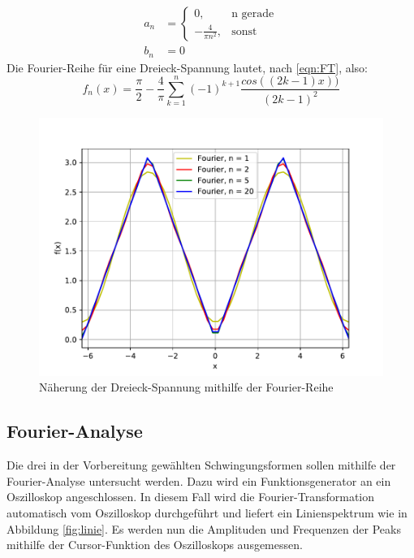 \begin{align}
  a_n &= \begin{cases}
    0 , & \text{n gerade} \\
     -\frac{4}{\pi n^2}, & \text{sonst}
\end{cases}\\
  b_n &= 0
\end{align}
Die Fourier-Reihe für eine Dreieck-Spannung lautet, nach \eqref{eqn:FT}, also:
\begin{equation}
  f_n(x) =\frac{\pi}{2} -\frac{4}{\pi}\sum\limits_{k=1}^{n}(-1)^{k+1}\frac{cos{((2k-1)x))}}{(2k-1)^2}
\end{equation}


\begin{figure}[H]
  \centering
  \includegraphics[scale=0.7]{Plots/Fourier/df.pdf}
  \caption{Näherung der Dreieck-Spannung mithilfe der Fourier-Reihe}
  \label{fig:df}
\end{figure}


\subsection{Fourier-Analyse}
Die drei in der Vorbereitung gewählten Schwingungsformen sollen mithilfe der Fourier-Analyse untersucht werden.
Dazu wird ein Funktionsgenerator an ein Oszilloskop angeschlossen.
In diesem Fall wird die Fourier-Transformation automatisch vom Oszilloskop durchgeführt und liefert ein
Linienspektrum wie in Abbildung \ref{fig:linie}. Es werden nun die Amplituden und Frequenzen
der Peaks mithilfe der Cursor-Funktion des Oszilloskops ausgemessen.


